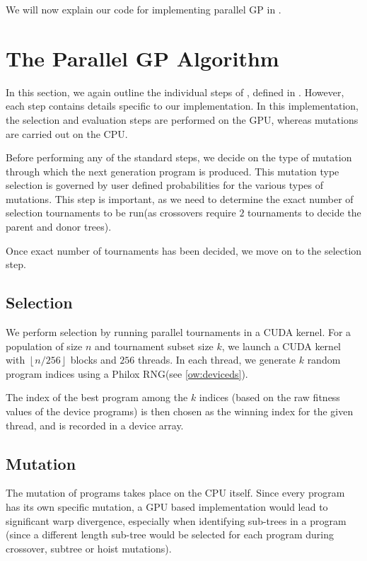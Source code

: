 We will now explain our code for implementing parallel GP in .
\section{The Parallel GP Algorithm}
\label{ow:paralgo}
In this section, we again outline the individual steps of , defined in . However, each step contains details specific to our implementation. In this implementation, the selection and evaluation steps are performed on the GPU, whereas mutations are carried out on the CPU.

Before performing any of the standard steps, we decide on the type of mutation through which the next generation program is produced. This mutation type selection is governed by user defined probabilities for the various types of mutations. This step is important, as we need to determine the exact  number of selection tournaments to be run(as crossovers require $2$ tournaments to decide the parent and donor trees). 

Once exact number of tournaments has been decided, we move on to the selection step.

\subsection{Selection}
\label{ow:selection}
We perform selection by running parallel tournaments in a CUDA kernel. For a population of size $n$ and tournament subset size $k$, we launch a CUDA kernel with $\left\lfloor n/256 \right\rfloor $ blocks and $256$ threads. In each thread, we generate $k$ random program indices using a Philox RNG(see \cref{ow:deviceds}). 

The index of the best program among the $k$ indices (based on the raw fitness values of the device programs) is then chosen as the winning index for the given thread, and is recorded in a device array.

\subsection{Mutation}
\label{ow:mutation}
The mutation of programs takes place on the CPU itself. Since every program has its own specific mutation, a GPU based implementation would lead to significant warp divergence, especially when identifying sub-trees in a program (since a different length sub-tree would be selected for each program during crossover, subtree or hoist mutations).

